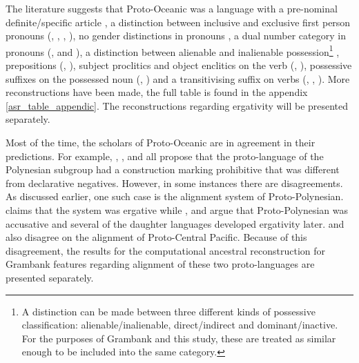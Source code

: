 \documentclass[a4paper,10pt]{article} %
\begin{document}

The literature suggests that Proto-Oceanic was a language with a pre-nominal definite/specific article \citep[136]{crowley1985common}, a distinction between inclusive and exclusive first person pronouns (\citet[112]{pawley1973some}, \citet[184]{crowley1985common}, \citet[500]{ross2004morphosyntactic}, \citet[67, 75]{lynchrosscrowley_proto_grammar_oceanic}), no gender distinctions in pronouns \citep[498]{ross2004morphosyntactic}, a dual number category in pronouns (\citet[498]{ross2004morphosyntactic}, \citet[69]{lynchrosscrowley_proto_grammar_oceanic} and \citet[173]{pawley1973some}), a distinction between alienable and inalienable possession\footnote{A distinction can be made between three different kinds of possessive classification: alienable/inalienable, direct/indirect and dominant/inactive. For the purposes of Grambank and this study, these are treated as similar enough to be included into the same category.} \citep[69]{lynchrosscrowley_proto_grammar_oceanic}, prepositions (\citet[167]{pawley1973some}, \citet[498]{ross2004morphosyntactic}), subject proclitics and object enclitics on the verb (\citet[498-499]{ross2004morphosyntactic}, \citet[83]{lynchrosscrowley_proto_grammar_oceanic}), possessive suffixes on the possessed noun (\citet[495]{ross2004morphosyntactic}, \citet[155]{pawley1973some}) and a transitivising suffix on verbs (\citet[352]{pawley1970change}, \citet[171]{pawley1973some}, \citet[80, 92]{lynchrosscrowley_proto_grammar_oceanic}). More reconstructions have been made, the full table is found in the appendix \ref{asr_table_appendic}. The reconstructions regarding ergativity will be presented separately.

Most of the time, the scholars of Proto-Oceanic are in agreement in their predictions. For example, \citet[142]{pawley1973some}, \citet[292]{ross2007two}, \citet[xiii, 125]{clark1976aspects} and \citet[89]{lynchrosscrowley_proto_grammar_oceanic} all propose that the proto-language of the Polynesian subgroup had a construction marking prohibitive that was different from declarative negatives. However, in some instances there are disagreements. As discussed earlier, one such case is the alignment system of Proto-Polynesian. \citet{clark1976aspects} claims that the system was ergative while \citet{hale_1968}, \citet{hohepa_1967,hohepa_1969} and \citet{chung1978} argue that Proto-Polynesian was accusative and several of the daughter languages developed ergativity later. \citet{kikusawa2002proto} and \citet{ball2007ergativity} also disagree on the alignment of Proto-Central Pacific. Because of this disagreement, the results for the computational ancestral reconstruction for Grambank features regarding alignment of these two proto-languages are presented separately.
\end{document}
